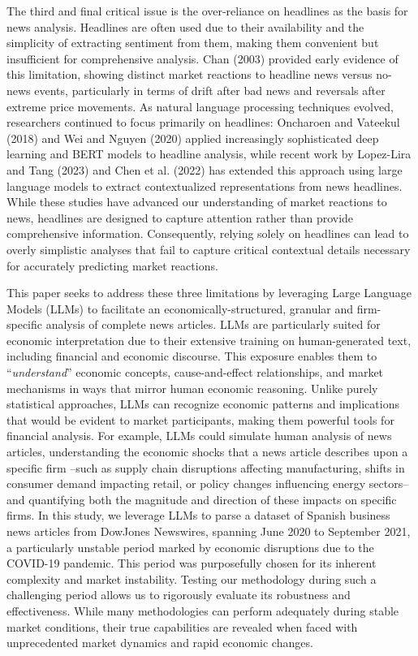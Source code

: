 \mx 
The third and final critical issue is the over-reliance on headlines as the basis for news analysis.
Headlines are often used due to their availability and the simplicity of extracting sentiment from them, making them convenient but insufficient for comprehensive analysis. Chan (2003) provided early evidence of this limitation, showing distinct market reactions to headline news versus no-news events, particularly in terms of drift after bad news and reversals after extreme price movements. As natural language processing techniques evolved, researchers continued to focus primarily on headlines: Oncharoen and Vateekul (2018) and Wei and Nguyen (2020) applied increasingly sophisticated deep learning and BERT models to headline analysis, while recent work by Lopez-Lira and Tang (2023) and Chen et al. (2022) has extended this approach using large language models to extract contextualized representations from news headlines.
While these studies have advanced our understanding of market reactions to news, headlines are designed to capture attention rather than provide comprehensive information. Consequently, relying solely on headlines can lead to overly simplistic analyses that fail to capture critical contextual details necessary for accurately predicting market reactions.


\mx 
This paper seeks to address these three limitations by leveraging Large Language Models (LLMs) to facilitate an economically-structured, granular and firm-specific analysis of complete news articles. 
LLMs are particularly suited for economic interpretation due to their extensive training on human-generated text, including financial and economic discourse. This exposure enables them to ``\textit{understand}'' economic concepts, cause-and-effect relationships, and market mechanisms in ways that mirror human economic reasoning. Unlike purely statistical approaches, LLMs can recognize economic patterns and implications that would be evident to market participants, making them powerful tools for financial analysis.
For example, LLMs could simulate human analysis of news articles, understanding the economic shocks that a news article describes upon a specific firm --such as supply chain disruptions affecting manufacturing, shifts in consumer demand impacting retail, or policy changes influencing energy sectors-- and quantifying both the magnitude and direction of these impacts on specific firms. 
In this study, we leverage LLMs to parse a dataset of Spanish business news articles from DowJones Newswires, spanning June 2020 to September 2021, a particularly unstable period marked by economic disruptions due to the COVID-19 pandemic. 
This period was purposefully chosen for its inherent complexity and market instability. Testing our methodology during such a challenging period allows us to rigorously evaluate its robustness and effectiveness. While many methodologies can perform adequately during stable market conditions, their true capabilities are revealed when faced with unprecedented market dynamics and rapid economic changes.

